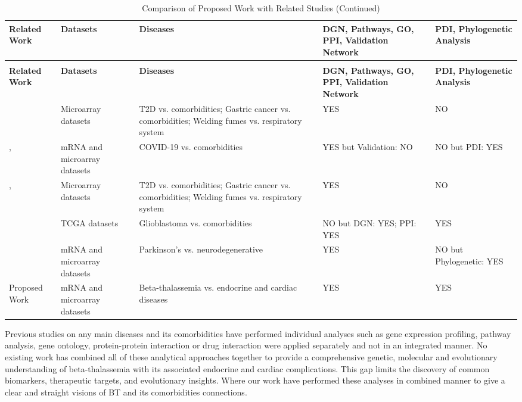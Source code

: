 \vspace{5mm} %
\begin{longtable}{|p{1.2cm}|p{2.9cm}|p{3.9cm}|p{2.8cm}|p{2cm}|}
\caption{Comparison of Proposed Work with Related Studies} \label{tab:2.2} \\
\hline
\textbf{Related Work} & \textbf{Datasets} & \textbf{Diseases} & \textbf{DGN, Pathways, GO, PPI, Validation Network} & \textbf{PDI, Phylogenetic Analysis} \\
\hline
\endfirsthead
\caption[]{Comparison of Proposed Work with Related Studies (Continued)} \\
\hline
\textbf{Related Work} & \textbf{Datasets} & \textbf{Diseases} & \textbf{DGN, Pathways, GO, PPI, Validation Network} & \textbf{PDI, Phylogenetic Analysis} \\
\hline
\endhead
\hline
\endfoot
\cite{b3} & Microarray datasets & T2D vs. comorbidities; Gastric cancer vs. comorbidities; Welding fumes vs. respiratory system & YES & NO \\
\hline
\cite{b4},\cite{b6} & mRNA and microarray datasets & COVID-19 vs. comorbidities & YES but Validation: NO & NO but PDI: YES \\
\hline
\cite{b7},\cite{b9} & Microarray datasets & T2D vs. comorbidities; Gastric cancer vs. comorbidities; Welding fumes vs. respiratory system & YES & NO \\
\hline
\cite{b8} & TCGA datasets & Glioblastoma vs. comorbidities & NO but DGN: YES; PPI: YES & YES \\
\hline
\cite{b10} & mRNA and microarray datasets & Parkinson's vs. neurodegenerative & YES & NO but Phylogenetic: YES \\
\hline
Proposed Work & mRNA and microarray datasets & Beta-thalassemia vs. endocrine and cardiac diseases & YES & YES \\
\hline
\end{longtable}

Previous studies on any main diseases and its comorbidities have performed individual analyses such as gene expression profiling, pathway analysis, gene ontology, protein-protein interaction or drug interaction were applied separately and not in an integrated manner. No existing work has combined all of these analytical approaches together to provide a comprehensive genetic, molecular and evolutionary understanding of beta-thalassemia with its associated endocrine and cardiac complications. This gap limits the discovery of common biomarkers, therapeutic targets, and evolutionary insights. Where our work have performed these analyses in combined manner to give a clear and straight visions of BT and its comorbidities connections.

